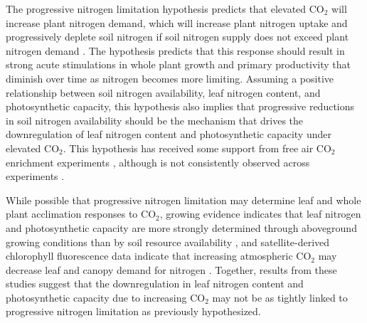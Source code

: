 The progressive nitrogen limitation hypothesis predicts that elevated CO$_2$ will increase plant nitrogen demand, which will increase plant nitrogen uptake and progressively deplete soil nitrogen if soil nitrogen supply does not exceed plant nitrogen demand . The hypothesis predicts that this response should result in strong acute stimulations in whole plant growth and primary productivity that diminish over time as nitrogen becomes more limiting. Assuming a positive relationship between soil nitrogen availability, leaf nitrogen content, and photosynthetic capacity, this hypothesis also implies that progressive reductions in soil nitrogen availability should be the mechanism that drives the downregulation of leaf nitrogen content and photosynthetic capacity under elevated CO$_2$. This hypothesis has received some support from free air CO$_2$ enrichment experiments , although is not consistently observed across experiments .

While possible that progressive nitrogen limitation may determine leaf and whole plant acclimation responses to CO$_2$, growing evidence indicates that leaf nitrogen and photosynthetic capacity are more strongly determined through aboveground growing conditions than by soil resource availability , and satellite-derived chlorophyll fluorescence data indicate that increasing atmospheric CO$_2$ may decrease leaf and canopy demand for nitrogen . Together, results from these studies suggest that the downregulation in leaf nitrogen content and photosynthetic capacity due to increasing CO$_2$ may not be as tightly linked to progressive nitrogen limitation as previously hypothesized.

